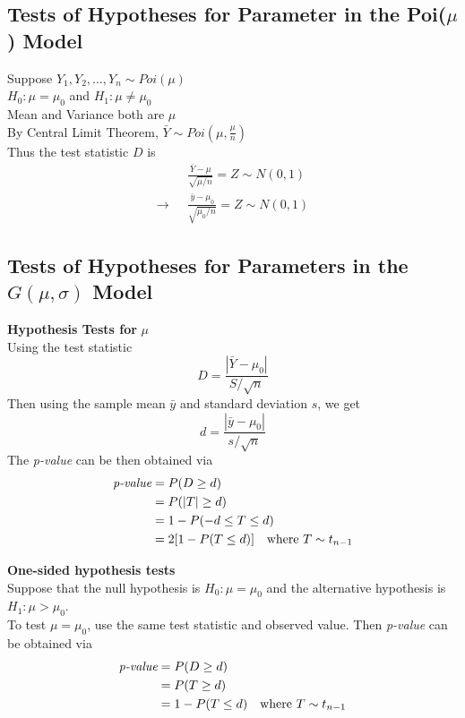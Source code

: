 \documentclass[12pt, leqno]{article}
\theoremstyle{definition}
\begin{document}
  \subsection{Tests of Hypotheses for Parameter in the Poi($\mu$) Model}
  Suppose $Y_{1}, Y_{2}, \dots, Y_{n} \sim Poi(\mu)$ \\
  $H_{0}: \mu = \mu_{0}$ and $H_{1}: \mu \not = \mu_{0}$ \\
  Mean and Variance both are $\mu$ \\
  By Central Limit Theorem, $\bar{Y} \sim Poi(\mu, \frac{\mu}{n})$ \\
  Thus the test statistic $D$ is
  \begin{align*}
  &\frac{\bar{Y} - \mu}{\sqrt{\mu / n}} = Z \sim N(0,1) \\
  \rightarrow~~~ &\frac{\bar{y} - \mu_{0}}{\sqrt{\mu_{0} / n}} = Z \sim N(0,1)
  \end{align*}

  \subsection{Tests of Hypotheses for Parameters in the $G(\mu, \sigma)$ Model}
  \textbf{Hypothesis Tests for} $\mu$ \\
  Using the test statistic
  $$D = \frac{|\bar{Y} - \mu_0|}{S/\sqrt{n}}$$
  Then using the sample mean $\bar{y}$ and standard deviation $s$, we get
  $$d = \frac{|\bar{y} - \mu_0|}{s/\sqrt{n}}$$
  The \emph{p-value} can be then obtained via
  \begin{align*}
    \emph{p-value} &= P(D \geq d) \\
    &= P(|T| \geq d) \\
    &= 1 - P(-d \leq T \leq d) \\
    &= 2[1 - P(T \leq d)] ~~~\text{where } T \sim t_{n-1}
  \end{align*}

  \textbf{One-sided hypothesis tests} \\
  Suppose that the null hypothesis is $H_{0} : \mu = \mu_{0}$ and the alternative hypothesis is $H_{1} : \mu > \mu_{0}$. \\
  To test $\mu = \mu_{0}$, use the same test statistic and observed value.
  Then \emph{p-value} can be obtained via
  \begin{align*}
    \emph{p-value} &= P(D \geq d) \\
    &= P(T \geq d) \\
    &= 1 - P(T \leq d) ~~~\text{where } T \sim t_{n-1}
  \end{align*}
\end{document}
